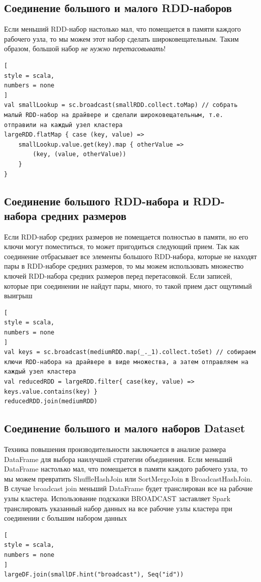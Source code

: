 \documentclass[%
	11pt,
	a4paper,
	utf8,
		]{article}
\begin{document}
\subsection{Соединение большого и малого RDD-наборов}

Если меньший RDD-набор настолько мал, что помещается в памяти каждого рабочего узла, то мы можем этот набор сделать широковещательным. Таким образом, большой набор \emph{не нужно перетасовывать}!
\begin{lstlisting}[
style = scala,
numbers = none	
]
val smallLookup = sc.broadcast(smallRDD.collect.toMap) // собрать малый RDD-набор на драйвере и сделали широковещательным, т.е. отправили на каждый узел кластера
largeRDD.flatMap { case (key, value) =>
	smallLookup.value.get(key).map { otherValue =>
		(key, (value, otherValue))
	}
}
\end{lstlisting}

\subsection{Соединение большого RDD-набора и RDD-набора средних размеров}

Если RDD-набор средних размеров не помещается полностью в памяти, но его ключи могут поместиться, то может пригодиться следующий прием. Так как соединение отбрасывает все элементы большого RDD-набора, которые не находят пары в RDD-наборе средних размеров, то мы можем использовать множество ключей RDD-набора средних размеров перед перетасовкой. Если записей, которые при соединении не найдут пары, много, то такой прием даст ощутимый выигрыш
\begin{lstlisting}[
style = scala,
numbers = none	
]
val keys = sc.broadcast(mediumRDD.map(_._1).collect.toSet) // собираем ключи RDD-набора на драйвере в виде множества, а затем отправляем на каждый узел кластера
val reducedRDD = largeRDD.filter{ case(key, value) => keys.value.contains(key) }
reducedRDD.join(mediumRDD)
\end{lstlisting}

\subsection{Соединение большого и малого наборов Dataset}

Техника повышения производительности заключается в анализе размера DataFrame для выбора наилучшей стратегии объединения. Если меньший DataFrame настолько мал, что помещается в памяти каждого рабочего узла, то мы можем превратить ShuffleHashJoin или SortMergeJoin в BroadcastHashJoin. В случае broadcast join меньший DataFrame будет транслирован все на рабочие узлы кластера. Использование подсказки BROADCAST заставляет Spark транслировать указанный набор данных на все рабочие узлы кластера при соединении с большим набором данных
\begin{lstlisting}[
style = scala,
numbers = none	
]
largeDF.join(smallDF.hint("broadcast"), Seq("id"))
\end{lstlisting}
\end{document}
